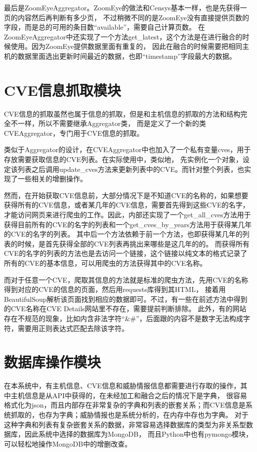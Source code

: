 最后是ZoomEyeAggregator。ZoomEye的做法和Censys基本一样，也是先获得一页的内容然后再判断有多少页，
不过稍微不同的是ZoomEye没有直接提供页数的字段，而是总的可用的条目数“available”，需要自己计算页数。
在ZoomEyeAggregator中还实现了一个方法get\_latest，这个方法是在进行融合的时候使用。因为ZoomEye提供数据里面有重复的，
因此在融合的时候需要把相同主机的数据里面选出更新时间最近的数据，也即“timestamp”字段最大的数据。

\section{CVE信息抓取模块}
\label{sec:CVE-module}

CVE信息的抓取虽然也属于信息的抓取，但是和主机信息的抓取的方法和结构完全不一样，所以不需要继承Aggregator类，
而是定义了一个新的类CVEAggregator，专门用于CVE信息的抓取。

类似于Aggregator的设计，在CVEAggregator中也加入了一个私有变量cves，用于存放需要获取信息的CVE列表。在实际使用中，类似地，
先实例化一个对象，设定该列表之后调用update\_cves方法来更新列表中的CVE。而针对整个列表，也实现了一些相关的增删操作。

然而，在开始获取CVE信息前，大部分情况下是不知道CVE的名称的，如果想要获得所有的CVE信息，或者某几年的CVE信息，需要首先得到这些CVE的名字，
才能访问网页来进行爬虫的工作。因此，内部还实现了一个get\_all\_cves方法用于获得目前所有的CVE的名字的列表和一个get\_cves\_by\_years方法用于获得某几年的CVE的名字的列表。
其中后一个方法依赖于前一个方法，也即获得某几年的列表的时候，是首先获得全部的CVE列表再挑出来哪些是这几年的的。
而获得所有CVE的名字的列表的方法也是去访问一个链接，这个链接以纯文本的格式记录了所有的CVE的基本信息，可以用爬虫的方法获得其中的CVE名称。

而对于任意一个CVE，爬取其信息的方法就是标准的爬虫方法，先用CVE的名称得到对应的CVE的信息的页面，然后用requests库得到其HTML，
接着用BeautifulSoup解析该页面找到相应的数据即可。不过，有一些在前述方法中得到的CVE名称在CVE Details网站里不存在，需要提前判断排除。
此外，有的网站存在不规范的现象，比如内含非法字符“\&\#”，后面跟的内容不是数字无法构成字符，需要用正则表达式匹配去除该字符。

\section{数据库操作模块}
\label{sec:database-module}

在本系统中，有主机信息、CVE信息和威胁情报信息都需要进行存取的操作，其中主机信息是从API中获得的，在未经加工和融合之后的情况下是字典，
很容易格式化为json，而且内部存在非常复杂的字典和列表的嵌套关系；而CVE信息是系统抓取的，也存为字典；威胁情报也是系统分析的，在内存中存也为字典。
对于这种字典和列表有复杂嵌套关系的数据，非常容易选择数据库的类型为非关系型数据库，因此系统中选择的数据库为MongoDB\cite{chodorow2013mongodb}，
而且Python中也有pymongo模块，可以轻松地操作MongoDB中的增删改查。

